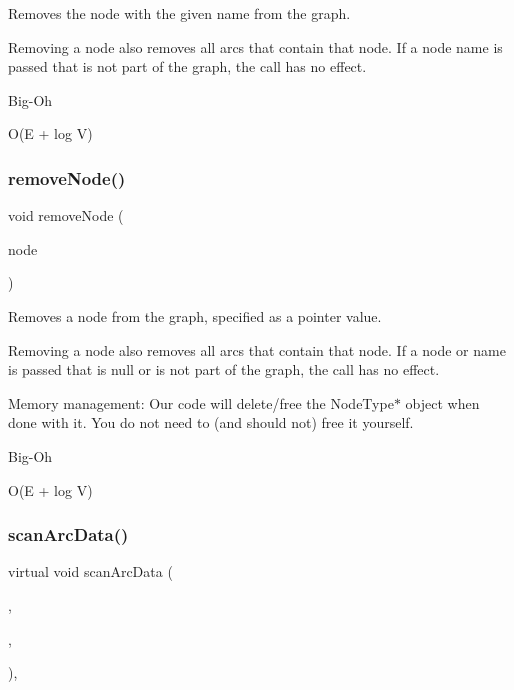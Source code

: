 Removes the node with the given name from the graph. 

Removing a node also removes all arcs that contain that node. If a node name is passed that is not part of the graph, the call has no effect. \begin{DoxyRefDesc}{Big-\/\+Oh}
\item[\mbox{\hyperlink{BigOh__BigOh000087}{Big-\/\+Oh}}]O(E + log V) \end{DoxyRefDesc}
\mbox{\label{classGraph_a2dfe63019975561914e0ed79551de108}} 
\subsubsection{\texorpdfstring{remove\+Node()}{removeNode()}\hspace{0.1cm}{\footnotesize\ttfamily [2/2]}}
{\footnotesize\ttfamily void remove\+Node (\begin{DoxyParamCaption}\item[{Node\+Type $\ast$}]{node }\end{DoxyParamCaption})}



Removes a node from the graph, specified as a pointer value. 

Removing a node also removes all arcs that contain that node. If a node or name is passed that is null or is not part of the graph, the call has no effect.

Memory management\+: Our code will delete/free the Node\+Type$\ast$ object when done with it. You do not need to (and should not) free it yourself. \begin{DoxyRefDesc}{Big-\/\+Oh}
\item[\mbox{\hyperlink{BigOh__BigOh000088}{Big-\/\+Oh}}]O(E + log V) \end{DoxyRefDesc}
\mbox{\label{classGraph_ac73c985ef66569e5f6df9c315cab466b}} 
\subsubsection{\texorpdfstring{scan\+Arc\+Data()}{scanArcData()}}
{\footnotesize\ttfamily virtual void scan\+Arc\+Data (\begin{DoxyParamCaption}\item[{\mbox{\hyperlink{classTokenScanner}{Token\+Scanner}} \&}]{,  }\item[{Arc\+Type $\ast$}]{,  }\item[{Arc\+Type $\ast$}]{ }\end{DoxyParamCaption})\hspace{0.3cm}{\ttfamily [inline]}, {\ttfamily [virtual]}}



